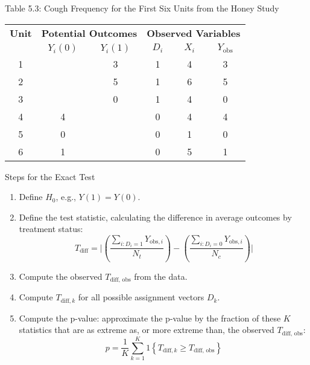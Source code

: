 \documentclass[xcolor=svgnames,t]{beamer}
\begin{document}
\begin{frame}{Table 5.3: Cough Frequency for the First Six Units from the Honey Study}
    \begin{table}[]
        \centering
        \begin{tabular}{@{}cccccc@{}} %
            \toprule
            \textbf{Unit} & \multicolumn{2}{c}{\textbf{Potential Outcomes}} & \multicolumn{3}{c}{\textbf{Observed Variables}} \\ 
            & \textbf{\( Y_i(0) \)} & \textbf{\( Y_i(1) \)} & \textbf{\( D_i \)} & \textbf{\( X_i \)} & \textbf{\( Y_{\text{obs}} \)} \\ \midrule
            1 &  & 3 & 1 & 4 & 3 \\
            2 &  & 5 & 1 & 6 & 5 \\
            3 &  & 0 & 1 & 4 & 0 \\
            4 & 4 &  & 0 & 4 & 4 \\
            5 & 0 &  & 0 & 1 & 0 \\
            6 & 1 &  & 0 & 5 & 1 \\
            \bottomrule
        \end{tabular}
    \end{table}
\end{frame}

\begin{frame}{Steps for the Exact Test}
    \begin{enumerate}
        \item Define \( H_0 \), e.g., \( Y(1) = Y(0) \).
        \pause
        \item Define the test statistic, calculating the difference in average outcomes by treatment status:
            \[
            T_{\text{diff}} = \Bigg|\left( \frac{\sum_{i: D_i=1} Y_{\text{obs}, i}}{N_t} \right) - \left( \frac{\sum_{i: D_i=0} Y_{\text{obs}, i}}{N_c} \right)\Bigg|
            \]
        \pause
        \item Compute the observed \( T_{\text{diff, obs}} \) from the data.
        \pause
        \item Compute \( T_{\text{diff}, k} \) for all possible assignment vectors \( D_k\).
        \pause
        \item Compute the p-value: approximate the p-value by the fraction of these \( K \) statistics that are as extreme as, or more extreme than, the observed \( T_{\text{diff, obs}} \):
            \[
            p = \frac{1}{K} \sum_{k=1}^K 1\left\{ T_{\text{diff}, k} \geq T_{\text{diff, obs}} \right\}
            \]
        \end{enumerate}
\end{frame}
\end{document}
